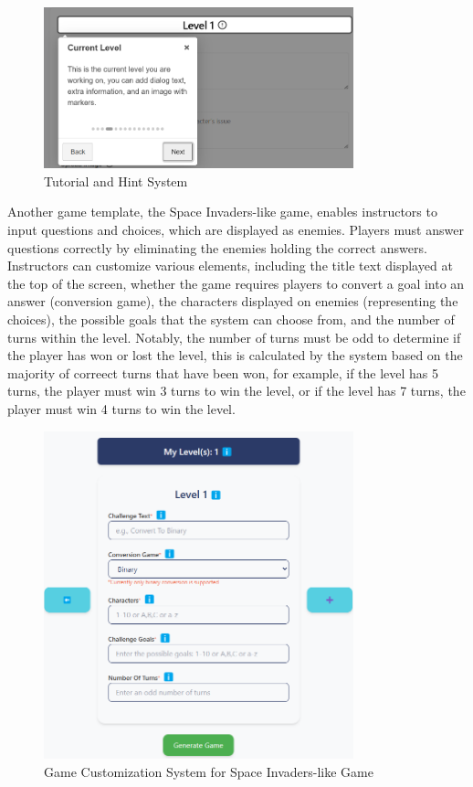 \begin{figure}
	\centering
	\includegraphics[width=0.8\textwidth]{figures/Diagnose_Game/Instructor_Portal_Diagnose_Game_hints.png}
	\caption{Tutorial and Hint System}
	\label{fig:tutorialHint}
\end{figure}

Another game template, the Space Invaders-like game, enables instructors to input questions and choices, which are displayed as enemies. Players must answer questions correctly by eliminating the enemies holding the correct answers. Instructors can customize various elements, including the title text displayed at the top of the screen, whether the game requires players to convert a goal into an answer (conversion game), the characters displayed on enemies (representing the choices), the possible goals that the system can choose from, and the number of turns within the level. Notably, the number of turns must be odd to determine if the player has won or lost the level, this is calculated by the system based on the majority of correect turns that have been won, for example, if the level has 5 turns, the player must win 3 turns to win the level, or if the level has 7 turns, the player must win 4 turns to win the level.

\begin{figure}
	\centering
	\includegraphics[width=0.8\textwidth]{figures/Space_Invaders/Instructor_Portal_Space_Invader.png}
	\caption{Game Customization System for Space Invaders-like Game}
	\label{fig:customizationSpaceInvaders}
\end{figure}

